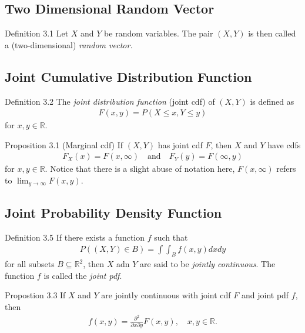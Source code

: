 \subsection{Two Dimensional Random Vector}
\begin{boks}{Definition 3.1}
Let $X$ and $Y$ be random variables. The pair $(X,Y)$ is then called a (two-dimensional) \textit{random vector.}
\end{boks}

\subsection{Joint Cumulative Distribution Function}
\begin{boks}{Definition 3.2}
The \textit{joint distribution function} (joint cdf) of $(X,Y)$ is defined as
\begin{align*}
    F(x,y) = P(X \leq x, Y \leq y)
\end{align*}
for $x,y \in \mathbb{R}$.
\end{boks}

\begin{boks}{Proposition 3.1 (Marginal cdf)}
If $(X, Y)$ has joint cdf $F$, then $X$ and $Y$ have cdfs
\begin{align*}
    F_X(x) = F(x, \infty) \quad \text{and} \quad F_Y(y) = F(\infty, y)
\end{align*}
for $x,y \in \mathbb{R}$. Notice that there is a slight abuse of notation here, $F(x,\infty)$ refers to $\lim_{y \rightarrow \infty} F(x, y)$.
\end{boks}

\subsection{Joint Probability Density Function}
\begin{boks}{Definition 3.5}
If there exists a function $f$ such that
\begin{align*}
    P((X, Y)\in B) = \int\int_B f(x, y) dx dy
\end{align*}
for all subsets $B\subseteq \mathbb{R}^2$, then $X$ adn $Y$ are said to be \textit{jointly continuous}. The function $f$ is called the \textit{joint pdf}.
\end{boks}

\begin{boks}{Propostion 3.3}
If $X$ and $Y$ are jointly continuous with joint cdf $F$ and joint pdf $f$, then
\begin{align*}
    f(x, y) = \frac{\partial^2}{\partial x \partial y} F(x,y), \quad x,y \in \mathbb{R}.
\end{align*}
\end{boks}


